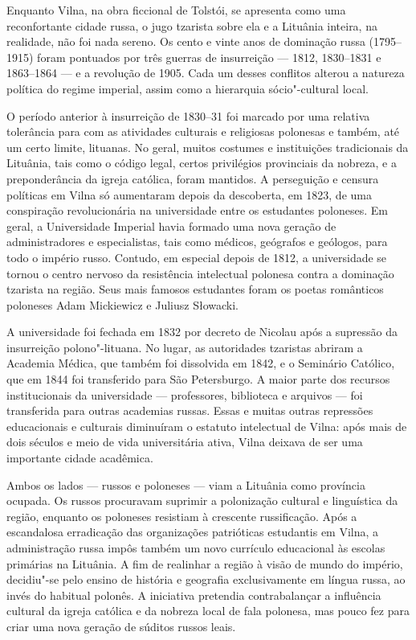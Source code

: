 Enquanto Vilna, na obra ficcional de Tolstói, se apresenta como uma
reconfortante cidade russa, o jugo tzarista sobre ela e a Lituânia
inteira, na realidade, não foi nada sereno. Os cento e vinte anos de
dominação russa (1795--1915) foram pontuados por três guerras de
insurreição --- 1812, 1830--1831 e 1863--1864 --- e a revolução de 1905. Cada
um desses conflitos alterou a natureza política do regime imperial,
assim como a hierarquia sócio"-cultural local.

O período anterior à insurreição de 1830--31 foi marcado por uma relativa
tolerância para com as atividades culturais e religiosas polonesas e
também, até um certo limite, lituanas. No geral, muitos costumes e
instituições tradicionais da Lituânia, tais como o código legal, certos
privilégios provinciais da nobreza, e a preponderância da igreja
católica, foram mantidos. A perseguição e censura políticas em Vilna só
aumentaram depois da descoberta, em 1823, de uma conspiração
revolucionária na universidade entre os estudantes poloneses. Em geral,
a Universidade Imperial havia formado uma nova geração de
administradores e especialistas, tais como médicos, geógrafos e
geólogos, para todo o império russo. Contudo, em especial depois de
1812, a universidade se tornou o centro nervoso da resistência
intelectual polonesa contra a dominação tzarista na região. Seus mais
famosos estudantes foram os poetas românticos poloneses Adam Mickiewicz
e Juliusz Słowacki.

A universidade foi fechada em 1832 por decreto de Nicolau  após a
supressão da insurreição polono"-lituana. No lugar, as autoridades
tzaristas abriram a Academia Médica, que também foi dissolvida em 1842,
e o Seminário Católico, que em 1844 foi transferido para São
Petersburgo. A maior parte dos recursos institucionais da universidade ---
professores, biblioteca e arquivos --- foi transferida para outras
academias russas. Essas e muitas outras repressões educacionais e
culturais diminuíram o estatuto intelectual de Vilna: após mais de dois
séculos e meio de vida universitária ativa, Vilna deixava de ser uma
importante cidade acadêmica.

Ambos os lados --- russos e poloneses --- viam a Lituânia como província
ocupada. Os russos procuravam suprimir a polonização cultural e
linguística da região, enquanto os poloneses resistiam à crescente
russificação. Após a escandalosa erradicação das organizações
patrióticas estudantis em Vilna, a administração russa impôs também um
novo currículo educacional às escolas primárias na Lituânia. A fim de
realinhar a região à visão de mundo do império, decidiu"-se pelo ensino
de história e geografia exclusivamente em língua russa, ao invés do
habitual polonês. A iniciativa pretendia contrabalançar a influência
cultural da igreja católica e da nobreza local de fala polonesa, mas
pouco fez para criar uma nova geração de súditos russos leais.

